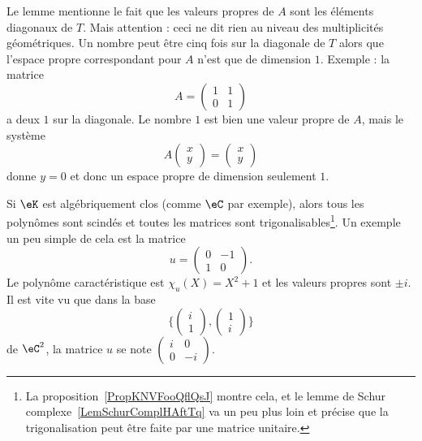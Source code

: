 \begin{remark}
    Le lemme mentionne le fait que les valeurs propres de \( A\) sont les éléments diagonaux de \( T\). Mais attention : ceci ne dit rien au niveau des multiplicités géométriques. Un nombre peut être cinq fois sur la diagonale de \( T\) alors que l'espace propre correspondant pour \( A\) n'est que de dimension \( 1\). Exemple : la matrice
    \begin{equation}
        A=\begin{pmatrix}
            1    &   1    \\
            0    &   1
        \end{pmatrix}
    \end{equation}
    a deux \( 1\) sur la diagonale. Le nombre \( 1\) est bien une valeur propre de \( A\), mais le système
    \begin{equation}
        A\begin{pmatrix}
            x    \\
            y
        \end{pmatrix}=\begin{pmatrix}
            x    \\
            y
        \end{pmatrix}
    \end{equation}
    donne \( y=0\) et donc un espace propre de dimension seulement \( 1\).
\end{remark}

\begin{remark}  \label{RemXFZTooXkGzQg}
    Si \( \eK\) est algébriquement clos (comme \( \eC\) par exemple), alors tous les polynômes sont scindés et toutes les matrices sont trigonalisables\footnote{La proposition~\ref{PropKNVFooQflQsJ} montre cela, et le lemme de Schur complexe~\ref{LemSchurComplHAftTq} va un peu plus loin et précise que la trigonalisation peut être faite par une matrice unitaire.}. Un exemple un peu simple de cela est la matrice
    \begin{equation}
        u=\begin{pmatrix}
            0    &   -1    \\
            1    &   0
        \end{pmatrix}.
    \end{equation}
    Le polynôme caractéristique est \( \chi_u(X)=X^2+1\) et les valeurs propres sont \( \pm i\). Il est vite vu que dans la base
    \begin{equation}
        \{ \begin{pmatrix}
        i    \\
    1
\end{pmatrix}, \begin{pmatrix}
1    \\
i
\end{pmatrix}\}
    \end{equation}
    de \( \eC^2\), la matrice \( u\) se note \( \begin{pmatrix}
        i    &   0    \\
        0    &   -i
    \end{pmatrix}\).
\end{remark}

